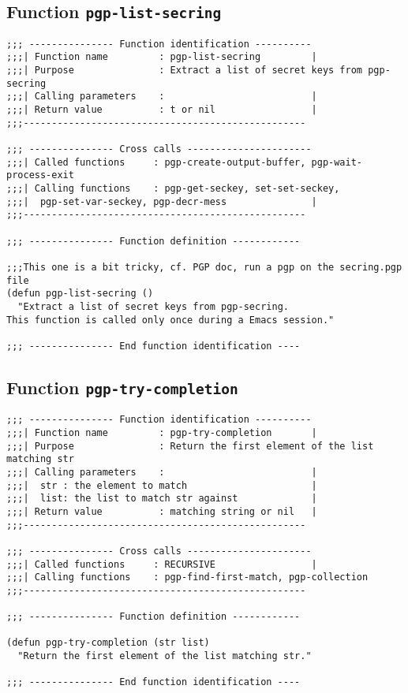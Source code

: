\subsection{Function {\tt pgp-list-secring}}
\leavevmode
\begin{verbatim}
;;; --------------- Function identification ----------
;;;| Function name         : pgp-list-secring         |
;;;| Purpose               : Extract a list of secret keys from pgp-secring
;;;| Calling parameters    :                          |
;;;| Return value          : t or nil                 |
;;;--------------------------------------------------

;;; --------------- Cross calls ----------------------
;;;| Called functions     : pgp-create-output-buffer, pgp-wait-process-exit
;;;| Calling functions    : pgp-get-seckey, set-set-seckey,
;;;|  pgp-set-var-seckey, pgp-decr-mess               |
;;;--------------------------------------------------

;;; --------------- Function definition ------------

;;;This one is a bit tricky, cf. PGP doc, run a pgp on the secring.pgp file
(defun pgp-list-secring ()
  "Extract a list of secret keys from pgp-secring.
This function is called only once during a Emacs session."

;;; --------------- End function identification ----
\end{verbatim}
\subsection{Function {\tt pgp-try-completion}}
\leavevmode
\begin{verbatim}
;;; --------------- Function identification ----------
;;;| Function name         : pgp-try-completion       |
;;;| Purpose               : Return the first element of the list matching str
;;;| Calling parameters    :                          |
;;;|  str : the element to match                      |
;;;|  list: the list to match str against             |
;;;| Return value          : matching string or nil   |
;;;--------------------------------------------------

;;; --------------- Cross calls ----------------------
;;;| Called functions     : RECURSIVE                 |
;;;| Calling functions    : pgp-find-first-match, pgp-collection
;;;--------------------------------------------------

;;; --------------- Function definition ------------

(defun pgp-try-completion (str list)
  "Return the first element of the list matching str."

;;; --------------- End function identification ----
\end{verbatim}
